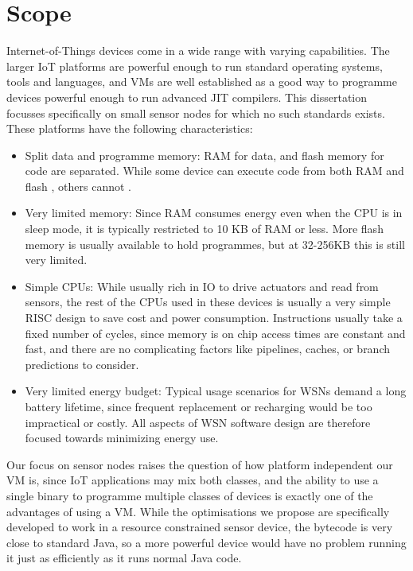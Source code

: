 \section{Scope}
\label{sec-introduction-scope}
Internet-of-Things devices come in a wide range with varying capabilities. The larger IoT platforms are powerful enough to run standard operating systems, tools and languages, and VMs are well established as a good way to programme devices powerful enough to run advanced JIT compilers. This dissertation focusses specifically on small sensor nodes for which no such standards exists. These platforms have the following characteristics:
\begin{itemize}
    \item Split data and programme memory: RAM for data, and flash memory for code are separated. While some device can execute code from both RAM and flash \cite{TexasInstrumentsIncorporated:MSP430F1611Datasheet}, others cannot \cite{Atmel:ATMEGA128Datasheet}.
    \item Very limited memory: Since RAM consumes energy even when the CPU is in sleep mode, it is typically restricted to 10 KB of RAM or less. More flash memory is usually available to hold programmes, but at 32-256KB this is still very limited.
    \item Simple CPUs: While usually rich in IO to drive actuators and read from sensors, the rest of the CPUs used in these devices is usually a very simple RISC design to save cost and power consumption. Instructions usually take a fixed number of cycles, since memory is on chip access times are constant and fast, and there are no complicating factors like pipelines, caches, or branch predictions to consider.
    \item Very limited energy budget: Typical usage scenarios for WSNs demand a long battery lifetime, since frequent replacement or recharging would be too impractical or costly. All aspects of WSN software design are therefore focused towards minimizing energy use.
\end{itemize}

Our focus on sensor nodes raises the question of how platform independent our VM is, since IoT applications may mix both classes, and the ability to use a single binary to programme multiple classes of devices is exactly one of the advantages of using a VM. While the optimisations we propose are specifically developed to work in a resource constrained sensor device, the bytecode is very close to standard Java, so a more powerful device would have no problem running it just as efficiently as it runs normal Java code.


